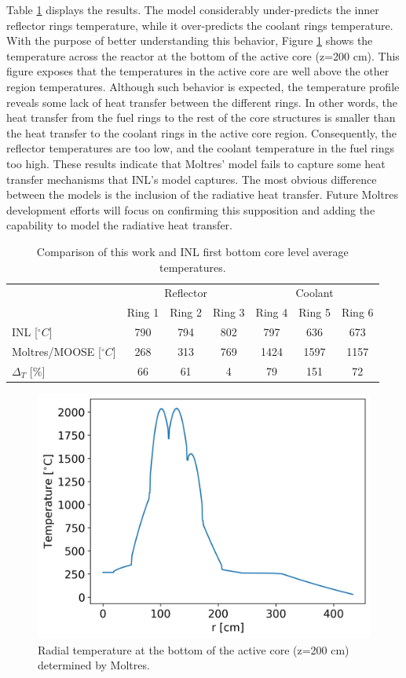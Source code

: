 Table \ref{tab:th-ex2a-1st-results} displays the results.
The model considerably under-predicts the inner reflector rings temperature, while it over-predicts the coolant rings temperature.
With the purpose of better understanding this behavior, Figure \ref{fig:ex2a-1st-model-across} shows the temperature across the reactor at the bottom of the active core (z=200 cm).
This figure exposes that the temperatures in the active core are well above the other region temperatures.
Although such behavior is expected, the temperature profile reveals some lack of heat transfer between the different rings.
In other words, the heat transfer from the fuel rings to the rest of the core structures is smaller than the heat transfer to the coolant rings in the active core region.
Consequently, the reflector temperatures are too low, and the coolant temperature in the fuel rings too high.
These results indicate that Moltres' model fails to capture some heat transfer mechanisms that INL's model captures.
The most obvious difference between the models is the inclusion of the radiative heat transfer.
Future Moltres development efforts will focus on confirming this supposition and adding the capability to model the radiative heat transfer.

\begin{table}[htbp!]
\centering
      \caption{Comparison of this work and INL \cite{strydom_inl_2013} first bottom core level average temperatures.}
      \label{tab:th-ex2a-1st-results}
\begin{tabular}{lcccccc}
    \toprule
                & \multicolumn{3}{c}{Reflector} & \multicolumn{3}{c}{Coolant}   \\
                & Ring 1   & Ring 2   & Ring 3   & Ring 4   & Ring 5  & Ring 6  \\
    \midrule
INL [$^{\circ}C$]           & 790    & 794     & 802     & 797     & 636     & 673     \\
Moltres/MOOSE [$^{\circ}C$] & 268    & 313     & 769     & 1424    & 1597    & 1157    \\
$\Delta_T$ [\%]    & 66       & 61     & 4       & 79      & 151     & 72      \\
    \bottomrule
  \end{tabular}
\end{table}

\begin{figure}[htbp!]
  \centering
  \includegraphics[width=0.50\linewidth]{figures-thermal/ex2a-across}
  \hfill
  \caption{Radial temperature at the bottom of the active core (z=200 cm) determined by Moltres.}
  \label{fig:ex2a-1st-model-across}
\end{figure}

